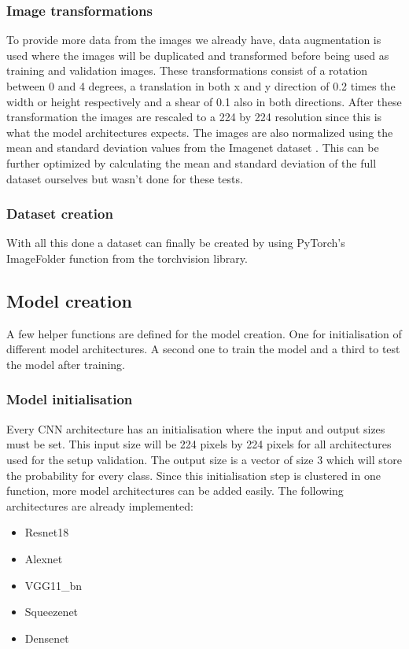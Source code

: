 	\subsubsection{Image transformations}
	To provide more data from the images we already have, data augmentation is used where the images will be duplicated and transformed before being used as training and validation images. These transformations consist of a rotation between 0 and 4 degrees, a translation in both x and y direction of 0.2 times the width or height respectively and a shear of 0.1 also in both directions. After these transformation the images are rescaled to a 224 by 224 resolution since this is what the model architectures expects. The images are also normalized using the mean and standard deviation values from the Imagenet dataset \citep{imagenet_cvpr09}. This can be further optimized by calculating the mean and standard deviation of the full dataset ourselves but wasn't done for these tests.
	
	\subsubsection{Dataset creation}
	\label{sec:impl:do:dscreate}
	With all this done a dataset can finally be created by using PyTorch's ImageFolder function from the torchvision library. \citep{pytorch} 
	
	\subsection{Model creation}
		A few helper functions are defined for the model creation. One for initialisation of different model architectures. A second one to train the model and a third to test the model after training.
		
		\subsubsection{Model initialisation}
		\label{sec:impl:visionalgorithms:init}
			Every CNN architecture has an initialisation where the input and output sizes must be set. This input size will be 224 pixels by 224 pixels for all architectures used for the setup validation. The output size is a vector of size 3 which will store the probability for every class. Since this initialisation step is clustered in one function, more model architectures can be added easily. The following architectures are already implemented:
			
			\begin{itemize}
				\item Resnet18
				\item Alexnet
				\item VGG11\_bn
				\item Squeezenet
				\item Densenet
			\end{itemize}
			
